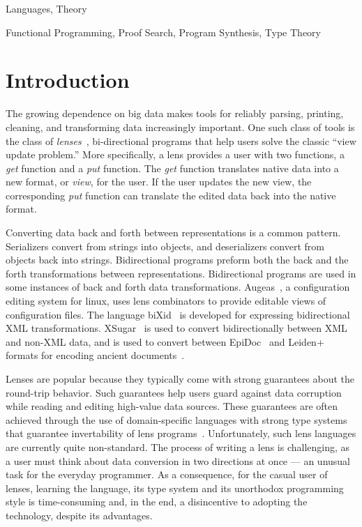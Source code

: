 \documentclass[numbers]{sigplanconf}
\begin{document}
\terms Languages, Theory

\keywords Functional Programming, Proof Search, Program Synthesis, Type Theory
\fi

\section{Introduction}

The growing dependence on big data makes tools for reliably parsing,
printing, cleaning, and transforming data increasingly important.
One such class of tools is the class of \emph{lenses}~\cite{Focal2005-long},
bi-directional programs that help users solve the classic ``view update problem.''
More specifically, a lens provides a user with two functions, a
\emph{get} function and a \emph{put} function.  The \emph{get}
function translates native data into a new format, or \emph{view}, for
the user.  If the user updates the new view, the corresponding
\emph{put} function can translate the edited data back into
the native format.

Converting data back and forth between representations is a common pattern.
Serializers convert from
strings into objects, and deserializers convert from objects back into strings.
Bidirectional programs preform both the back and the forth
transformations between representations.
Bidirectional programs are used in some instances of back and forth data
transformations.
Augeas~\cite{?}, a configuration editing system for linux, uses lens combinators
to provide editable views of configuration files.
The language biXid~\cite{bixid} is developed for expressing bidirectional XML
transformations.
XSugar~\cite{xsugar} is used to convert bidirectionally between XML and non-XML data,
and is used to convert between EpiDoc~\cite{epidoc} and Leiden+~\cite{leidenplus} formats for
encoding ancient documents~\cite{epidocleidenplus}.

Lenses are popular because they typically come with strong guarantees
about the round-trip behavior.  Such guarantees
help users guard against data corruption while reading and editing
high-value data sources.  These guarantees are often achieved through
the use of domain-specific languages with strong type systems that
guarantee invertability of lens programs~\cite{Focal2005-long,boomerang,symmetric-lenses}.  Unfortunately, such
lens languages are currently quite non-standard.  The
process of writing a lens is challenging, as a user must think
about data conversion in two directions at once --- an
unusual task for the everyday programmer.  As a consequence, 
for the casual user of lenses, learning the language, its type system and its
unorthodox programming style is time-consuming and, in the end,
a disincentive to adopting the technology, despite its advantages.
\end{document}
